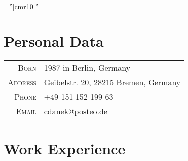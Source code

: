 \documentclass[a4paper,10pt]{article} %
\newcommand{\orcid}[1]{\href{https://orcid.org/#1}{\textcolor[HTML]{A6CE39}{\aiOrcid}}}
\begin{document}

\font\fb=''[cmr10]'' %

\par{\bigskip \qquad \LARGE \orcid{0000-0002-4453-1140} \LARGE \href{https://github.com/chrisdane}{\color{black}\faGithub}\par}
\vspace{0.1cm}

\section{Personal Data}
\vspace{0.3cm}

\begin{center}
\begin{tabular}{rl}
\textsc{Born} & 1987 in Berlin, Germany\\
\textsc{Address} & Geibelstr. 20, 28215 Bremen, Germany \\
\textsc{Phone} & +49 151 152 199 63\\
\textsc{Email} & \href{mailto:cdanek@posteo.de}{cdanek@posteo.de}
\end{tabular}
\end{center}

\vspace{0.3cm}
\section{Work Experience}
\vspace{0.3cm}
\end{document}
